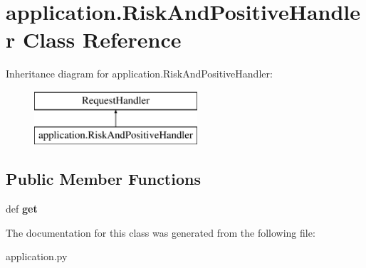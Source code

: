 \hypertarget{classapplication_1_1_risk_and_positive_handler}{\section{application.\-Risk\-And\-Positive\-Handler Class Reference}
\label{classapplication_1_1_risk_and_positive_handler}
}
Inheritance diagram for application.\-Risk\-And\-Positive\-Handler\-:\begin{figure}[H]
\begin{center}
\leavevmode
\includegraphics[height=2.000000cm]{classapplication_1_1_risk_and_positive_handler}
\end{center}
\end{figure}
\subsection*{Public Member Functions}
\begin{DoxyCompactItemize}
\item 
\hypertarget{classapplication_1_1_risk_and_positive_handler_a497de62ea0fd76c5f2c98961c05476f1}{def {\bfseries get}}\label{classapplication_1_1_risk_and_positive_handler_a497de62ea0fd76c5f2c98961c05476f1}

\end{DoxyCompactItemize}


The documentation for this class was generated from the following file\-:\begin{DoxyCompactItemize}
\item 
application.\-py\end{DoxyCompactItemize}
